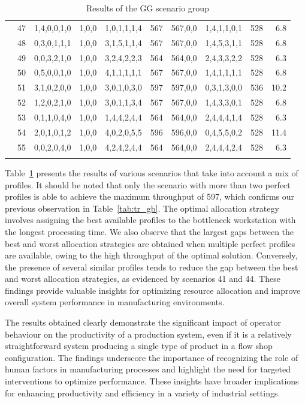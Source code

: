 \documentclass[review,12pt, 3p, times]{elsarticle}
\begin{document}
\begin{longtable}{|c|c|c|c|c|c|c|c|c|r|}
	& 47 & 1,4,0,0,1,0 & 1,0,0 &1,0,1,1,1,4 & 567 & 567,0,0 & 1,4,1,1,0,1 & 528 & 6.8\\
	& 48 & 0,3,0,1,1,1 & 1,0,0 &3,1,5,1,1,4 & 567 & 567,0,0 & 1,4,5,3,1,1 & 528 & 6.8\\
	& 49 & 0,0,3,2,1,0 & 1,0,0 &3,2,4,2,2,3 & 564 & 564,0,0 & 2,4,3,3,2,2 & 528 & 6.3\\
	& 50 & 0,5,0,0,1,0 & 1,0,0 &4,1,1,1,1,1 & 567 & 567,0,0 & 1,4,1,1,1,1 & 528 & 6.8\\
	& 51 & 3,1,0,2,0,0 & 1,0,0 &3,0,1,0,3,0 & 597 & 597,0,0 & 0,3,1,3,0,0 & 536 & 10.2\\
	& 52 & 1,2,0,2,1,0 & 1,0,0 &3,0,1,1,3,4 & 567 & 567,0,0 & 1,4,3,3,0,1 & 528 & 6.8\\
	& 53 & 0,1,1,0,4,0 & 1,0,0 &1,4,4,2,4,4 & 564 & 564,0,0 & 2,4,4,4,1,4 & 528 & 6.3\\
	& 54 & 2,0,1,0,1,2 & 1,0,0 &4,0,2,0,5,5 & 596 & 596,0,0 & 0,4,5,5,0,2 & 528 & 11.4\\
	& 55 & 0,0,2,0,4,0 & 1,0,0 &4,2,4,2,4,4 & 564 & 564,0,0 & 2,4,4,4,2,4 & 528 & 6.3\\
	\hline
	\hline
	\caption{Results of the GG scenario group} 
	\label{tab:tr_gg}
\end{longtable}
					
Table~\ref{tab:tr_gg} presents the results of various scenarios that take into account a mix of profiles. It should be noted that only the scenario with more than two perfect profiles is able to achieve the maximum throughput of 597, which confirms our previous observation in Table~\ref{tab:tr_gb}. The optimal allocation strategy involves assigning the best available profiles to the bottleneck workstation with the longest processing time. We also observe that the largest gaps between the best and worst allocation strategies are obtained when multiple perfect profiles are available, owing to the high throughput of the optimal solution. Conversely, the presence of several similar profiles tends to reduce the gap between the best and worst allocation strategies, as evidenced by scenarios 41 and 44. These findings provide valuable insights for optimizing resource allocation and improve overall system performance in manufacturing environments.
					
The results obtained clearly demonstrate the significant impact of operator behaviour on the productivity of a production system, even if it is a relatively straightforward system producing a single type of product in a flow shop configuration. The findings underscore the importance of recognizing the role of human factors in manufacturing processes and highlight the need for targeted interventions to optimize performance. These insights have broader implications for enhancing productivity and efficiency in a variety of industrial settings.
				   
\end{document}
